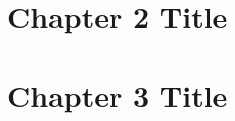 \documentclass[letterpaper,12pt]{report}
\begin{document}
\begin{linenumbers}

% 

% 





% 
% 
% 
% 


\chapter{Chapter 2 Title}






\chapter{Chapter 3 Title}





\printbibliography[heading=bibintoc]




\end{linenumbers}
\end{document}
